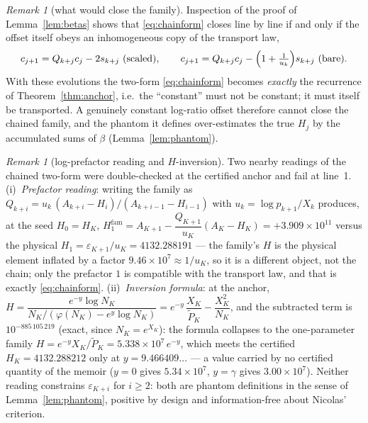 \documentclass[11pt]{article}
\theoremstyle{remark}
\newtheorem{remark}[theorem]{Remark}
\newcommand{\uk}{u_k}
\newcommand{\eps}{\varepsilon}
\newcommand{\Ptil}{\widetilde P}
\newcommand{\gam}{\gamma}
\begin{document}
\begin{remark}[what would close the family]\label{rem:telescope}
Inspection of the proof of Lemma~\ref{lem:betas} shows that \eqref{eq:chainform}
closes line by line if and only if the offset itself obeys an
inhomogeneous copy of the transport law,
\[
c_{j+1}=Q_{k+j}c_j-2s_{k+j}\ \text{(scaled)},\qquad
c_{j+1}=Q_{k+j}c_j-\Bigl(1+\tfrac1{\uk}\Bigr)s_{k+j}\ \text{(bare)}.
\]
With these evolutions the two-form \eqref{eq:chainform} becomes \emph{exactly}
the recurrence of Theorem~\ref{thm:anchor}, i.e.\ the ``constant'' must not
be constant; it must itself be transported. A genuinely constant log-ratio
offset therefore cannot close the chained family, and the phantom it
defines over-estimates the true $H_j$ by the accumulated sums of $\beta$
(Lemma~\ref{lem:phantom}).
\end{remark}

\begin{remark}[log-prefactor reading and $H$-inversion]
\label{rem:logvar}
Two nearby readings of the chained two-form were double-checked at the
certified anchor and fail at line~1. (i)~\emph{Prefactor reading}:
writing the family as
$Q_{k+i}=u_k\,(A_{k+i}-H_i)/(A_{k+i-1}-H_{i-1})$ with
$u_k=\log p_{k+1}/X_k$ produces, at the seed $H_0=H_K$,
$H^{\mathrm{fam}}_1=A_{K+1}-\dfrac{Q_{K+1}}{u_K}(A_K-H_K)
=+3.909\times10^{11}$ versus the physical
$H_1=\eps_{K+1}/u_K=4132.288191$ --- the family's $H$ is the physical
element inflated by a factor $9.46\times10^{7}\approx1/u_K$, so it is a
different object, not the chain; only the prefactor $1$ is compatible
with the transport law, and that is exactly \eqref{eq:chainform}.
(ii)~\emph{Inversion formula}: at the anchor,
$H=\dfrac{e^{-y}\log N_K}{N_K/(\varphi(N_K)-e^y\log N_K)}
=e^{-y}\,\dfrac{X_K}{\Ptil_K}-\dfrac{X_K^2}{N_K}$, and the subtracted
term is $10^{-885\,105\,219}$ (exact, since $N_K=e^{X_K}$): the formula
collapses to the one-parameter family
$H=e^{-y}X_K/\Ptil_K=5.338\times10^{7}\,e^{-y}$, which meets the
certified $H_K=4132.288212$ only at $y=9.466409\dots$ --- a value
carried by no certified quantity of the memoir ($y=0$ gives
$5.34\times10^{7}$, $y=\gam$ gives $3.00\times10^{7}$). Neither reading
constrains $\eps_{K+i}$ for $i\ge2$: both are phantom definitions in the
sense of Lemma~\ref{lem:phantom}, positive by design and
information-free about Nicolas' criterion.
\end{remark}
\end{document}
